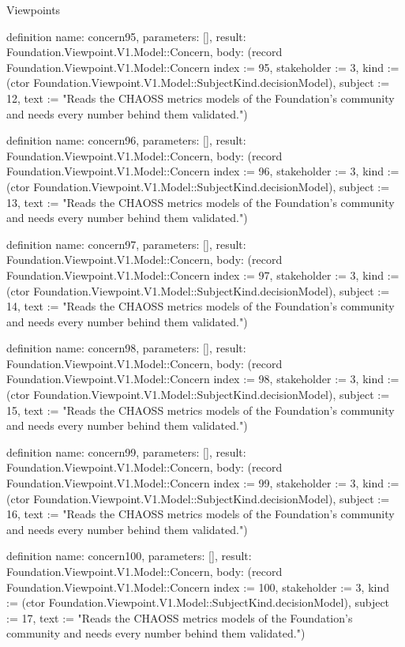 \begin{lexlean}{Viewpoints}
\begin{semanticmodule}
definition{
  name: concern95,
  parameters: [],
  result: Foundation.Viewpoint.V1.Model::Concern,
  body: (record Foundation.Viewpoint.V1.Model::Concern {index := 95, stakeholder := 3, kind := (ctor Foundation.Viewpoint.V1.Model::SubjectKind.decisionModel), subject := 12, text := "Reads the CHAOSS metrics models of the Foundation's community and needs every number behind them validated."})
}

definition{
  name: concern96,
  parameters: [],
  result: Foundation.Viewpoint.V1.Model::Concern,
  body: (record Foundation.Viewpoint.V1.Model::Concern {index := 96, stakeholder := 3, kind := (ctor Foundation.Viewpoint.V1.Model::SubjectKind.decisionModel), subject := 13, text := "Reads the CHAOSS metrics models of the Foundation's community and needs every number behind them validated."})
}

definition{
  name: concern97,
  parameters: [],
  result: Foundation.Viewpoint.V1.Model::Concern,
  body: (record Foundation.Viewpoint.V1.Model::Concern {index := 97, stakeholder := 3, kind := (ctor Foundation.Viewpoint.V1.Model::SubjectKind.decisionModel), subject := 14, text := "Reads the CHAOSS metrics models of the Foundation's community and needs every number behind them validated."})
}

definition{
  name: concern98,
  parameters: [],
  result: Foundation.Viewpoint.V1.Model::Concern,
  body: (record Foundation.Viewpoint.V1.Model::Concern {index := 98, stakeholder := 3, kind := (ctor Foundation.Viewpoint.V1.Model::SubjectKind.decisionModel), subject := 15, text := "Reads the CHAOSS metrics models of the Foundation's community and needs every number behind them validated."})
}

definition{
  name: concern99,
  parameters: [],
  result: Foundation.Viewpoint.V1.Model::Concern,
  body: (record Foundation.Viewpoint.V1.Model::Concern {index := 99, stakeholder := 3, kind := (ctor Foundation.Viewpoint.V1.Model::SubjectKind.decisionModel), subject := 16, text := "Reads the CHAOSS metrics models of the Foundation's community and needs every number behind them validated."})
}

definition{
  name: concern100,
  parameters: [],
  result: Foundation.Viewpoint.V1.Model::Concern,
  body: (record Foundation.Viewpoint.V1.Model::Concern {index := 100, stakeholder := 3, kind := (ctor Foundation.Viewpoint.V1.Model::SubjectKind.decisionModel), subject := 17, text := "Reads the CHAOSS metrics models of the Foundation's community and needs every number behind them validated."})
}


\end{semanticmodule}
\end{lexlean}

